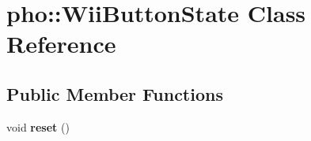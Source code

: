 \hypertarget{classpho_1_1WiiButtonState}{\section{pho\-:\-:Wii\-Button\-State Class Reference}
\label{classpho_1_1WiiButtonState}
}
\subsection*{Public Member Functions}
\begin{DoxyCompactItemize}
\item 
\hypertarget{classpho_1_1WiiButtonState_a2f1ec7e94e22616ce408d8e72f8424dd}{void {\bfseries reset} ()}\label{classpho_1_1WiiButtonState_a2f1ec7e94e22616ce408d8e72f8424dd}

\end{DoxyCompactItemize}

